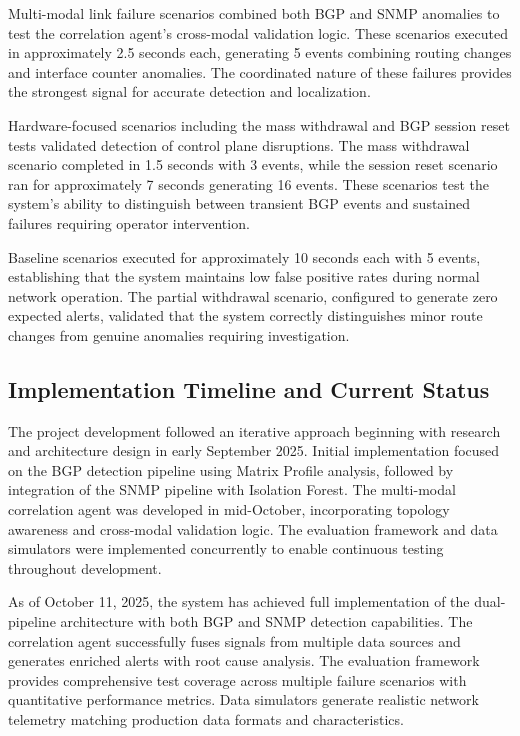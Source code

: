\documentclass[11pt]{article}
\begin{document}
Multi-modal link failure scenarios combined both BGP and SNMP anomalies to test the correlation agent's cross-modal validation logic. These scenarios executed in approximately 2.5 seconds each, generating 5 events combining routing changes and interface counter anomalies. The coordinated nature of these failures provides the strongest signal for accurate detection and localization.

Hardware-focused scenarios including the mass withdrawal and BGP session reset tests validated detection of control plane disruptions. The mass withdrawal scenario completed in 1.5 seconds with 3 events, while the session reset scenario ran for approximately 7 seconds generating 16 events. These scenarios test the system's ability to distinguish between transient BGP events and sustained failures requiring operator intervention.

Baseline scenarios executed for approximately 10 seconds each with 5 events, establishing that the system maintains low false positive rates during normal network operation. The partial withdrawal scenario, configured to generate zero expected alerts, validated that the system correctly distinguishes minor route changes from genuine anomalies requiring investigation.

\subsection{Implementation Timeline and Current Status}

The project development followed an iterative approach beginning with research and architecture design in early September 2025. Initial implementation focused on the BGP detection pipeline using Matrix Profile analysis, followed by integration of the SNMP pipeline with Isolation Forest. The multi-modal correlation agent was developed in mid-October, incorporating topology awareness and cross-modal validation logic. The evaluation framework and data simulators were implemented concurrently to enable continuous testing throughout development.

As of October 11, 2025, the system has achieved full implementation of the dual-pipeline architecture with both BGP and SNMP detection capabilities. The correlation agent successfully fuses signals from multiple data sources and generates enriched alerts with root cause analysis. The evaluation framework provides comprehensive test coverage across multiple failure scenarios with quantitative performance metrics. Data simulators generate realistic network telemetry matching production data formats and characteristics.
\end{document}
